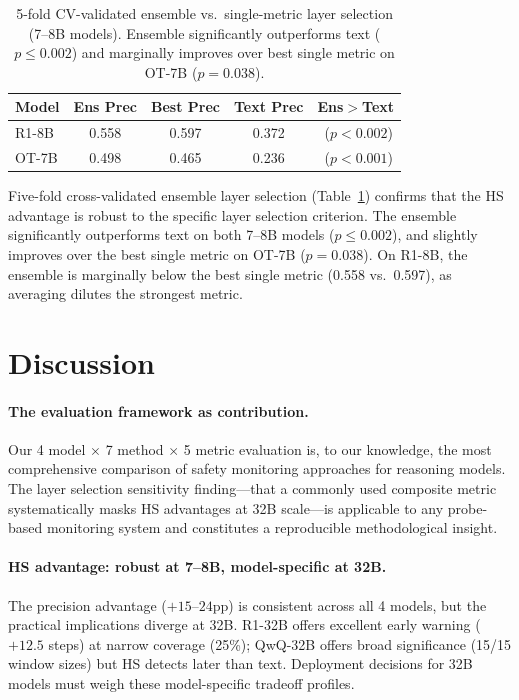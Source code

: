 \documentclass[11pt,a4paper]{article}
\newcommand{\pp}{\text{pp}}
\newcommand{\cmark}{\checkmark}
\begin{document}
\begin{table}[t]
\centering
\small
\begin{tabular}{lcccl}
\toprule
\textbf{Model} & \textbf{Ens Prec} & \textbf{Best Prec} & \textbf{Text Prec} & \textbf{Ens$>$Text} \\
\midrule
R1-8B & 0.558 & 0.597 & 0.372 & \cmark~($p<0.002$) \\
OT-7B & 0.498 & 0.465 & 0.236 & \cmark~($p<0.001$) \\
\bottomrule
\end{tabular}
\caption{5-fold CV-validated ensemble vs.\ single-metric layer selection (7--8B models). Ensemble significantly outperforms text ($p \leq 0.002$) and marginally improves over best single metric on OT-7B ($p = 0.038$).}
\label{tab:ensemble}
\end{table}

Five-fold cross-validated ensemble layer selection (Table~\ref{tab:ensemble}) confirms that the HS advantage is robust to the specific layer selection criterion.
The ensemble significantly outperforms text on both 7--8B models ($p \leq 0.002$), and slightly improves over the best single metric on OT-7B ($p = 0.038$).
On R1-8B, the ensemble is marginally below the best single metric (0.558 vs.\ 0.597), as averaging dilutes the strongest metric.

\section{Discussion}

\paragraph{The evaluation framework as contribution.}
Our 4 model $\times$ 7 method $\times$ 5 metric evaluation is, to our knowledge, the most comprehensive comparison of safety monitoring approaches for reasoning models.
The layer selection sensitivity finding---that a commonly used composite metric systematically masks HS advantages at 32B scale---is applicable to any probe-based monitoring system and constitutes a reproducible methodological insight.

\paragraph{HS advantage: robust at 7--8B, model-specific at 32B.}
The precision advantage ($+15$--$24\pp$) is consistent across all 4 models, but the practical implications diverge at 32B.
R1-32B offers excellent early warning ($+12.5$ steps) at narrow coverage (25\%); QwQ-32B offers broad significance (15/15 window sizes) but HS detects later than text.
Deployment decisions for 32B models must weigh these model-specific tradeoff profiles.
\end{document}

